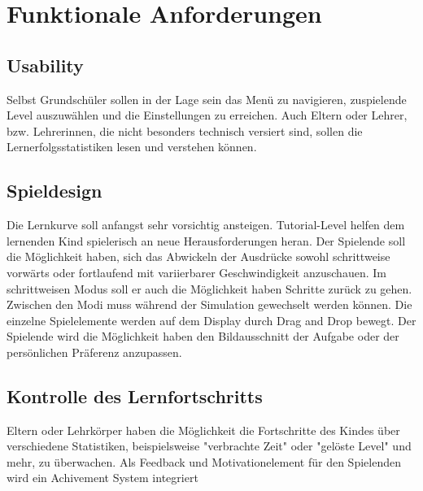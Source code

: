 \section{Funktionale Anforderungen}

\subsection{Usability}

\begin{requirements}
	Selbst Grundschüler sollen in der Lage sein das Menü zu navigieren, zuspielende Level auszuwählen und die Einstellungen zu erreichen.
	Auch  Eltern oder Lehrer, bzw. Lehrerinnen, die nicht besonders technisch versiert sind, sollen die Lernerfolgsstatistiken lesen und verstehen können.
\end{requirements}

\subsection{Spieldesign}

\begin{requirements}
	Die Lernkurve soll anfangst sehr vorsichtig ansteigen. Tutorial-Level helfen dem lernenden Kind spielerisch an neue Herausforderungen heran.
	Der Spielende soll die Möglichkeit haben, sich das Abwickeln der Ausdrücke sowohl schrittweise vorwärts oder fortlaufend mit variierbarer Geschwindigkeit anzuschauen. Im schrittweisen Modus soll er auch die Möglichkeit haben Schritte zurück zu gehen. Zwischen den Modi muss während der Simulation gewechselt werden können.
	Die einzelne Spielelemente werden auf dem Display durch Drag and Drop bewegt.
	Der Spielende wird die Möglichkeit haben den Bildausschnitt der Aufgabe oder der persönlichen Präferenz anzupassen.	

\end{requirements}


\subsection{Kontrolle des Lernfortschritts}

\begin{requirements}
	Eltern oder Lehrkörper haben die Möglichkeit die Fortschritte des Kindes über verschiedene Statistiken, beispielsweise "verbrachte Zeit" oder "gelöste Level" und mehr,  zu überwachen.
	Als Feedback und Motivationelement für den Spielenden wird ein Achivement System integriert 
\end{requirements}

